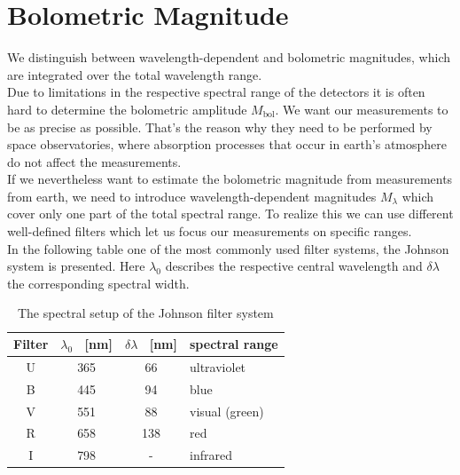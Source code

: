 \section{Bolometric Magnitude}
We distinguish between wavelength-dependent and bolometric magnitudes, which are integrated over the total wavelength range. \\ 
Due to limitations in the respective spectral range of the detectors it is often hard to determine the bolometric amplitude $M_{\text{bol}}$. We want our measurements to be as precise as possible. That's the reason why they need to be performed by space observatories, where absorption processes  that occur in earth's atmosphere do not affect the measurements. \\
If we nevertheless want to estimate the bolometric magnitude from measurements from earth, we need to introduce wavelength-dependent magnitudes $M_{\lambda}$ which cover only one part of the total spectral range. 
 To realize this we can use different well-defined filters which let us focus our measurements on specific ranges. \\
 
In the following table one of the most commonly used filter systems, the Johnson system is presented. Here $\lambda_0$ describes the respective central wavelength and $\delta\lambda$ the corresponding spectral width. 
\begin{table}[H]
\centering
\setlength{\tabcolsep}{5mm}
\setlength\extrarowheight{2mm}
\begin{tabular}{c| c c l }

Filter & $\lambda_0$ \ [nm] & $\delta\lambda$ \ [nm] & spectral range \\ \hline 
U & 365 & 66 & ultraviolet  \\
B & 445 & 94 & blue\\
V & 551 & 88 & visual (green) \\
R & 658 & 138 & red \\
I & 798 & - & infrared \\

\end{tabular}
\caption{\label{tab:johnson} The spectral setup of the Johnson filter system \cite{Pott2017}}

\end{table}


